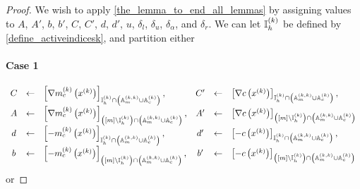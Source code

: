\begin{proof}
We wish to apply \cref{the_lemma_to_end_all_lemmas} by assigning values to
$A$, $A'$, $b$, $b'$, $C$, $C'$, $d$, $d'$, $u$, $\delta_l$, $\delta_u$, $\delta_{\alpha}$, and $\delta_r$.
We can let ${ \mathbb I_h^{(k)} }$ be defined by \cref{define_activeindicesk}, and partition either

\paragraph*{Case 1}
\begin{align*}
\begin{array}{cclccl}
C  &\gets& \left[\nabla m^{(k)}_c\left(x^{(k)}\right)\right]_{{ \mathbb I_h^{(k)} } \cap \left({\mathbb A_m^{(k, k)}} \cup {\mathbb A_c^{(k)}}\right)}, &
C' &\gets& \left[\nabla c\left(x^{(k)}\right)\right]_{{ \mathbb I_h^{(k)} } \cap \left({\mathbb A_m^{(k, k)}} \cup {\mathbb A_c^{(k)}}\right)}, \\
A  &\gets& \left[\nabla m^{(k)}_c\left(x^{(k)}\right)\right]_{\left([m] \setminus { \mathbb I_h^{(k)} }\right) \cap \left({\mathbb A_m^{(k, k)}} \cup {\mathbb A_c^{(k)}}\right)}, &
A' &\gets& \left[\nabla c\left(x^{(k)}\right)\right]_{\left([m] \setminus { \mathbb I_h^{(k)} }\right) \cap \left({\mathbb A_m^{(k, k)}} \cup {\mathbb A_c^{(k)}}\right)} \\
d  &\gets& \left[-m^{(k)}_c\left(x^{(k)}\right)\right]_{{ \mathbb I_h^{(k)} } \cap \left({\mathbb A_m^{(k, k)}} \cup {\mathbb A_c^{(k)}}\right)}, &
d' &\gets& \left[-c\left(x^{(k)}\right)\right]_{{ \mathbb I_h^{(k)} } \cap \left({\mathbb A_m^{(k, k)}} \cup {\mathbb A_c^{(k)}}\right)}, \\
b  &\gets& \left[-m^{(k)}_c\left(x^{(k)}\right)\right]_{\left([m] \setminus { \mathbb I_h^{(k)} }\right) \cap \left({\mathbb A_m^{(k, k)}} \cup {\mathbb A_c^{(k)}}\right)}, &
b' &\gets& \left[-c\left(x^{(k)}\right)\right]_{\left([m] \setminus { \mathbb I_h^{(k)} }\right) \cap \left({\mathbb A_m^{(k, k)}} \cup {\mathbb A_c^{(k)}}\right)} \\
\end{array}
\end{align*}
or

\end{proof}

